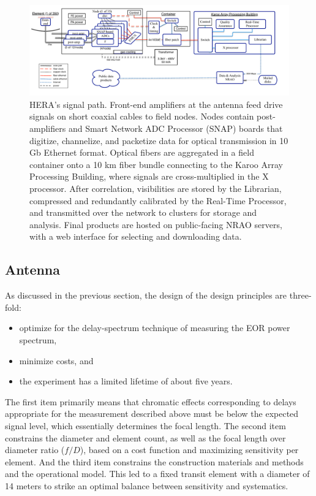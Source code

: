 \documentclass[preprint,11pt]{aastex}
\begin{document}
\begin{figure}[h]
	\centering
	\includegraphics[width=1\textwidth]{plots/HERA_high_level_block_diagram.pdf}
	\caption{HERA's signal path.  Front-end amplifiers at the antenna feed drive signals on short coaxial cables to 
field nodes.  Nodes contain post-amplifiers and Smart Network ADC Processor (SNAP) boards that digitize, channelize,
and packetize data for optical transmission in 10 Gb Ethernet format.  Optical fibers are aggregated in a field container
onto a 10 km fiber bundle connecting to the Karoo Array Processing Building, where signals are cross-multiplied
in the X processor.  After correlation, visibilities are stored by the Librarian, compressed and redundantly calibrated
by the Real-Time Processor, and transmitted over the network to clusters for storage and analysis.  Final products are
hosted on public-facing NRAO servers, with a web interface for selecting and downloading data.}
	\label{fig:overallBlockDiagram}
	\vspace{-5pt}
\end{figure}

\subsection{Antenna}
\label{sec:antenna}
\vspace{-5pt}

As discussed in the previous section, the design of the design principles are three-fold:
\begin{itemize}
\item optimize for the delay-spectrum technique of measuring the EOR power spectrum,
\item minimize costs, and
\item the experiment has a limited lifetime of about five years.
\end{itemize}
The first item primarily means that chromatic effects corresponding to delays appropriate for the measurement described above must be below the expected signal level, which essentially determines the focal length.  The second item constrains the diameter and element count, as well as the focal length over diameter ratio ($f/D$), based on a cost function and maximizing sensitivity per element.  And the third item constrains the construction materials and methods and the operational model.  This led to a fixed transit element with a diameter of 14 meters to strike an optimal balance between sensitivity and systematics.
\end{document}
